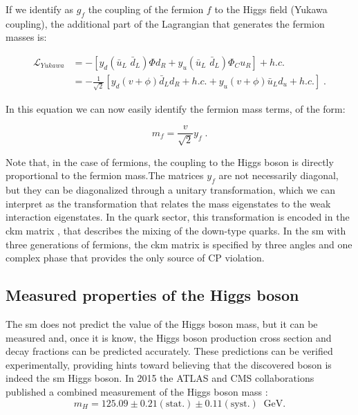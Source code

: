 \noindent If we identify as $g_f$ the coupling of the fermion $f$ to the Higgs field (Yukawa coupling), the additional part of the Lagrangian that generates the fermion masses is:

\begin{equation}
\begin{aligned}
\mathcal{L}_{Yukawa} &= - \left[  y_d \left( \bar{u}_L \,\, \bar{d}_L  \right) \Phi d_R +  y_u \left( \bar{u}_L \,\, \bar{d}_L  \right) \Phi_C u_R \right] + h.c. \\
&= - \frac{1}{\sqrt{2}} \left[  y_d \left( v + \phi \right) \bar{d}_L d_R + h.c. + y_u \left( v + \phi \right) \bar{u}_L d_u + h.c. \right]  \; .
\end{aligned}
\end{equation}

\noindent In this equation we can now easily identify the fermion mass terms, of the form:

\begin{equation}
m_f =  \frac{v}{\sqrt{2}} y_f \; .
\end{equation}

\noindent Note that, in the case of fermions, the coupling to the Higgs boson is directly proportional to the fermion mass.The matrices $y_f$ are not necessarily diagonal, but they can be diagonalized through a unitary transformation, which we can interpret as the transformation that relates the mass eigenstates to the weak interaction eigenstates. In the quark sector, this transformation is encoded in the \gls{ckm} matrix \cite{Cabibbo:1963yz, Kobayashi:1973fv}, that describes the mixing of the down-type quarks. In the \gls{sm} with three generations of fermions, the \gls{ckm} matrix is specified by three angles and one complex phase that provides the only source of CP violation.

\subsection{Measured properties of the Higgs boson}

The \gls{sm} does not predict the value of the Higgs boson mass, but it can be measured and, once it is know, the Higgs boson production cross section and decay fractions can be predicted accurately. These predictions can be verified experimentally, providing hints toward believing that the discovered boson is indeed the \gls{sm} Higgs boson. In 2015 the ATLAS and CMS collaborations published a combined measurement of the Higgs boson mass \cite{Aad:2015zhl}:
\begin{equation}
m_H = 125.09 \pm 0.21 (\mathrm{stat.}) \pm 0.11 (\mathrm{syst.}) \;\; \mathrm{GeV}.
\end{equation}

